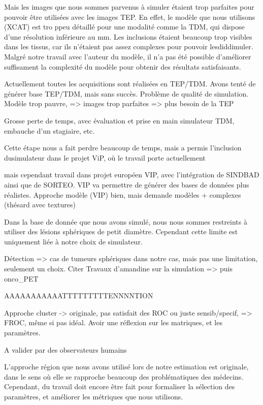Mais les images que nous sommes parvenus à simuler étaient trop parfaites pour pouvoir être utilisées avec les images TEP. En effet, le modèle que nous utilisons (XCAT) est tro ppeu détaillé pour une modalité comme la TDM, qui dispose d'une résolution inférieure au mm. Les inclusions étaient beaucoup trop visibles dans les tissus, car ils n'étaient pas assez complexes pour pouvoir lesdiddimuler. Malgré notre travail avec l'auteur du modèle, il n'a pas été possible d'améliorer suffisament la complexité du modèle pour obtenir des résultats satisfaisants.


Actuellement toutes les acquisitions sont réalisées en TEP/TDM. Avons tenté de générer base TEP/TDM, mais sans succès. Problème de qualité de simulation. Modèle trop pauvre, => images trop parfaites => plus besoin de la TEP

Grosse perte de temps, avec évaluation et prise en main simulateur TDM, embauche d'un stagiaire, etc.

Cette étape nous a fait perdre beaucoup de temps, mais a permis l'inclusion dusimulateur dans le projet ViP, où le travail porte actuellement 

mais cependant travail dans projet européen VIP, avec l'intégration de SINDBAD ainsi que de SORTEO. VIP va permettre de générer des bases de données plus réalistes.
Approche modèle (VIP) bien, mais demande modèles + complexes (thésard avec textures)

Dans la base de donnée que nous avons simulé, nous nous sommes restreints à utiliser des lésions sphériques de petit diamètre. Cependant cette limite est uniquement liée à notre choix de simulateur.

Détection => cas de tumeurs sphériques dans notre cas, mais pas une limitation, seulement un choix. Citer Travaux d'amandine sur la simulation => puis onco\_PET



AAAAAAAAAAATTTTTTTTTENNNNTION

Approche cluster -> originale, pas satisfait des ROC ou juste sensib/specif, => FROC, même si pas idéal. Avoir une réflexion sur les matriques, et les paramètres.


A valider par des observateurs humains

L'approche région que nous avons utilisé lors de notre estimation est originale, dans le sens où elle se rapproche beaucoup des problématiques des médecins. Cependant, du travail doit encore être fait pour formaliser la sélection des paramètres, et améliorer les métriques que nous utilisons.
